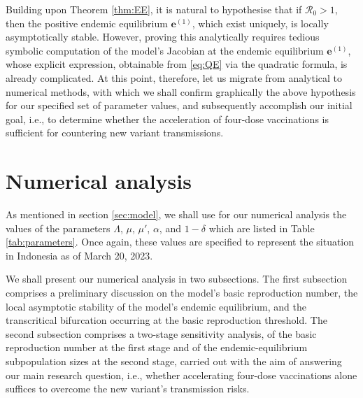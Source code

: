 \documentclass[11pt,reqno]{amsart}
\begin{document}
Building upon Theorem \ref{thm:EE}, it is natural to hypothesise that if $\mathcal{R}_0>1$, then the positive endemic equilibrium $\mathbf{e}^{\left(1\right)}$, which exist uniquely, is locally asymptotically stable. However, proving this analytically requires tedious symbolic computation of the model's Jacobian at the endemic equilibrium $\mathbf{e}^{\left(1\right)}$, whose explicit expression, obtainable from \eqref{eq:QE} via the quadratic formula, is already complicated. At this point, therefore, let us migrate from analytical to numerical methods, with which we shall confirm graphically the above hypothesis for our specified set of parameter values, and subsequently accomplish our initial goal, i.e., to determine whether the acceleration of four-dose vaccinations is sufficient for countering new variant transmissions.


\section{Numerical analysis}\label{sec:numerical}

As mentioned in section \ref{sec:model}, we shall use for our numerical analysis the values of the parameters $\Lambda$, $\mu$, $\mu'$, $\alpha$, and $1-\delta$ which are listed in Table \ref{tab:parameters}. Once again, these values are specified to represent the situation in Indonesia as of March 20, 2023.

We shall present our numerical analysis in two subsections. The first subsection comprises a preliminary discussion on the model's basic reproduction number, the local asymptotic stability of the model's endemic equilibrium, and the transcritical bifurcation occurring at the basic reproduction threshold. The second subsection comprises a two-stage sensitivity analysis, of the basic reproduction number at the first stage and of the endemic-equilibrium subpopulation sizes at the second stage, carried out with the aim of answering our main research question, i.e., whether accelerating four-dose vaccinations alone suffices to overcome the new variant's transmission risks.
\end{document}
